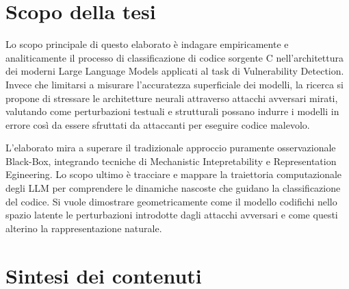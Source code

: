 \section{Scopo della tesi}
Lo scopo principale di questo elaborato è indagare empiricamente e analiticamente il processo di classificazione di codice sorgente C nell'architettura dei moderni Large Language Models applicati al task di Vulnerability Detection. Invece che limitarsi a misurare l'accuratezza superficiale dei modelli, la ricerca si propone di stressare le architetture neurali attraverso attacchi avversari mirati, valutando come perturbazioni testuali e strutturali possano indurre i modelli in errore così da essere sfruttati da attaccanti per eseguire codice malevolo. 

L'elaborato mira a superare il tradizionale approccio puramente osservazionale Black-Box, integrando tecniche di Mechanistic Intepretability e Representation Egineering.
Lo scopo ultimo è tracciare e mappare la traiettoria computazionale degli LLM per comprendere le dinamiche nascoste che guidano la classificazione del codice.
Si vuole dimostrare geometricamente come il modello codifichi nello spazio latente le perturbazioni introdotte dagli attacchi avversari e come questi alterino la rappresentazione naturale.

\section{Sintesi dei contenuti}


